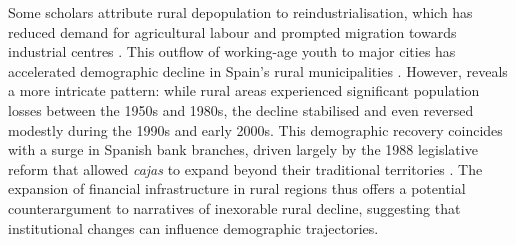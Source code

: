 \documentclass[a4paper,11pt,oneside]{article}
\begin{document}


Some scholars attribute rural depopulation to reindustrialisation, which has reduced demand for agricultural labour and prompted migration towards industrial centres \citep{collantes2019lugares}. This outflow of working-age youth to major cities has accelerated demographic decline in Spain's rural municipalities \citep{camarero2020despoblamiento}. However, \cite{bandres2021despoblacion} reveals a more intricate pattern: while rural areas experienced significant population losses between the 1950s and 1980s, the decline stabilised and even reversed modestly during the 1990s and early 2000s. This demographic recovery coincides with a surge in Spanish bank branches, driven largely by the 1988 legislative reform that allowed \textit{cajas} to expand beyond their traditional territories \citep{bernad.fuentelsaz.gomez2008deregulation,cunat2010did,sabater2011bank,martin2017fall}. The expansion of financial infrastructure in rural regions thus offers a potential counterargument to narratives of inexorable rural decline, suggesting that institutional changes can influence demographic trajectories.



\end{document}
